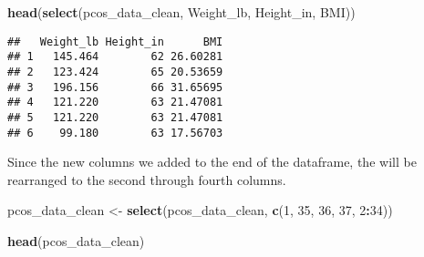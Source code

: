 \documentclass[
]{article}
\newenvironment{Shaded}{\begin{snugshade}}{\end{snugshade}}
\newcommand{\DecValTok}[1]{\textcolor[rgb]{0.00,0.00,0.81}{#1}}
\newcommand{\FunctionTok}[1]{\textcolor[rgb]{0.13,0.29,0.53}{\textbf{#1}}}
\newcommand{\NormalTok}[1]{#1}
\newcommand{\OtherTok}[1]{\textcolor[rgb]{0.56,0.35,0.01}{#1}}
\newcommand{\SpecialCharTok}[1]{\textcolor[rgb]{0.81,0.36,0.00}{\textbf{#1}}}
\begin{document}
\begin{Shaded}
\begin{Highlighting}[]
\FunctionTok{head}\NormalTok{(}\FunctionTok{select}\NormalTok{(pcos\_data\_clean, Weight\_lb, Height\_in, BMI))}
\end{Highlighting}
\end{Shaded}

\begin{verbatim}
##   Weight_lb Height_in      BMI
## 1   145.464        62 26.60281
## 2   123.424        65 20.53659
## 3   196.156        66 31.65695
## 4   121.220        63 21.47081
## 5   121.220        63 21.47081
## 6    99.180        63 17.56703
\end{verbatim}

Since the new columns we added to the end of the dataframe, the will be
rearranged to the second through fourth columns.

\begin{Shaded}
\begin{Highlighting}[]
\NormalTok{pcos\_data\_clean }\OtherTok{\textless{}{-}} \FunctionTok{select}\NormalTok{(pcos\_data\_clean, }\FunctionTok{c}\NormalTok{(}\DecValTok{1}\NormalTok{, }\DecValTok{35}\NormalTok{, }\DecValTok{36}\NormalTok{, }\DecValTok{37}\NormalTok{, }\DecValTok{2}\SpecialCharTok{:}\DecValTok{34}\NormalTok{))}
\end{Highlighting}
\end{Shaded}

\begin{Shaded}
\begin{Highlighting}[]
\FunctionTok{head}\NormalTok{(pcos\_data\_clean)}
\end{Highlighting}
\end{Shaded}
\end{document}
